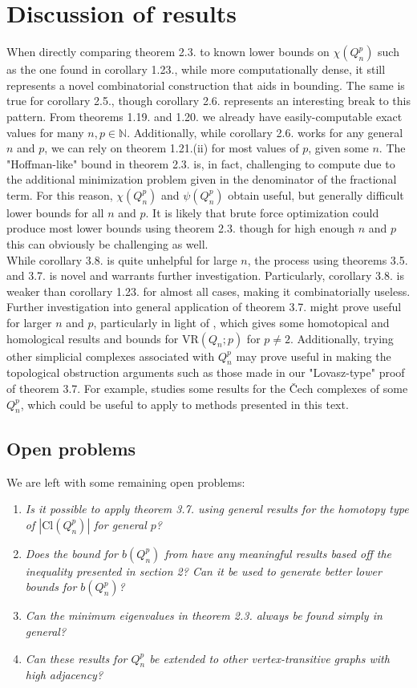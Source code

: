 \documentclass[12pt]{amsart}
\numberwithin{figure}{section}
\theoremstyle{plain}
\begin{document}
\section{Discussion of results}
\indent When directly comparing theorem 2.3. to known lower bounds on $\chi(Q_{n}^{p})$ such as the one found in corollary 1.23., while more computationally dense, it still represents a novel combinatorial construction that aids in bounding. The same is true for corollary 2.5., though corollary 2.6. represents an interesting break to this pattern. From theorems 1.19. and 1.20. we already have easily-computable exact values for many $n,p \in \mathbb{N}$. Additionally, while corollary 2.6. works for any general $n$ and $p$, we can rely on theorem 1.21.(ii) for most values of $p$, given some $n$. The "Hoffman-like" bound in theorem 2.3. is, in fact, challenging to compute due to the additional minimization problem given in the denominator of the fractional term. For this reason, $\chi(Q_{n}^{p})$ and $\psi(Q_{n}^{p})$ obtain useful, but generally difficult lower bounds for all $n$ and $p$. It is likely that brute force optimization could produce most lower bounds using theorem 2.3. though for high enough $n$ and $p$ this can obviously be challenging as well.\\
\indent While corollary 3.8. is quite unhelpful for large $n$, the process using theorems 3.5. and 3.7. is novel and warrants further investigation. Particularly, corollary 3.8. is weaker than corollary 1.23. for almost all cases, making it combinatorially useless. Further investigation into general application of theorem 3.7. might prove useful for larger $n$ and $p$, particularly in light of \cite{AdamsVirk23}, which gives some homotopical and homological results and bounds for $\mathrm{VR}(Q_{n}; p)$ for $p\neq 2$. Additionally, trying other simplicial complexes associated with $Q_{n}^{p}$ may prove useful in making the topological obstruction arguments such as those made in our "Lovasz-type" proof of theorem 3.7. For example, \cite{AdamsShuklaSingh23} studies some results for the \v{C}ech complexes of some $Q_{n}^{p}$, which could be useful to apply to methods presented in this text.
\subsection{Open problems}
We are left with some remaining open problems:
\begin{enumerate}[label=(\roman*)]
    \item\textit{Is it possible to apply theorem 3.7. using general results for the homotopy type of $|\mathrm{Cl}(Q_{n}^{p})|$ for general $p$?}
    \item\textit{Does the bound for $b(Q_{n}^{p})$ from \cite{AK11} have any meaningful results based off the inequality presented in section 2? Can it be used to generate better lower bounds for $b(Q_{n}^{p})$?}
    \item\textit{Can the minimum eigenvalues in theorem 2.3. always be found simply in general?}
    \item\textit{Can these results for $Q_{n}^{p}$ be extended to other vertex-transitive graphs with high adjacency?}
\end{enumerate}
\end{document}
